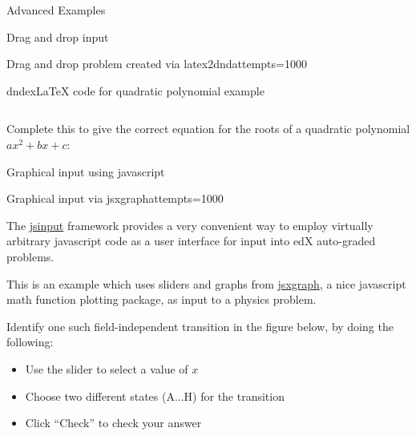 \begin{edXchapter}{Advanced Examples}
\begin{edXsection}{Drag and drop input}
\begin{edXvertical}
\begin{edXproblem}{Drag and drop problem created via latex2dnd}{attempts=1000}
\begin{edXshowhide}{dndex}{LaTeX code for quadratic polynomial example}
\begin{verbatim}
\end{verbatim}
\end{edXshowhide}

Complete this to give the correct equation for the roots of a
quadratic polynomial $ax^2 + bx + c$:


\end{edXproblem}


\end{edXvertical}

\end{edXsection}


\begin{edXsection}{Graphical input using javascript}

\begin{edXvertical}

\begin{edXproblem}{Graphical input via jsxgraph}{attempts=1000}

The \href{http://edx.readthedocs.org/projects/devdata/en/latest/course_data_formats/jsinput.html}{jsinput} framework provides a very convenient way to
employ virtually arbitrary javascript code as a user interface for
input into edX auto-graded problems.  

This is an example which uses sliders and graphs from
\href{http://jsxgraph.uni-bayreuth.de/}{jsxgraph}, a nice javascript
math function plotting package, as input to a physics problem.

     Identify one such field-independent transition in the figure
     below, by doing the following:
     \begin{itemize}
     \item Use the slider to select a value of $x$
     \item Choose two different states (A...H) for the transition
     \item Click ``Check'' to check your answer
     \end{itemize}




\end{edXproblem}
\end{edXvertical}
\end{edXsection}
\end{edXchapter}
